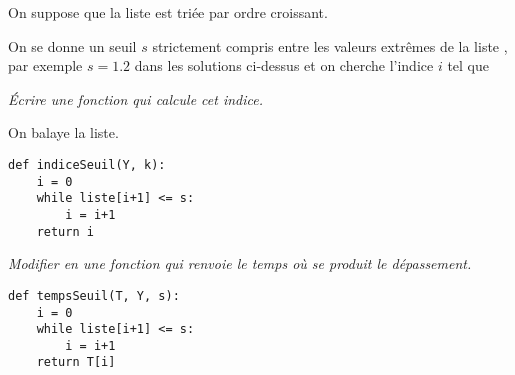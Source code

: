 On suppose que la liste  est triée par ordre croissant.

On se donne un seuil $s$ strictement compris entre les valeurs extrêmes de la liste , par exemple $s = 1.2$ dans les solutions ci-dessus et on cherche l'indice $i$ tel que 
\begin{Exercise}\it Écrire une fonction  qui calcule cet indice.
\end{Exercise}
\begin{Answer} On balaye la liste.
\begin{lstlisting}
def indiceSeuil(Y, k):
    i = 0
    while liste[i+1] <= s:
        i = i+1
    return i
\end{lstlisting}
\newpage
\end{Answer}
\begin{Exercise}\it Modifier en  une fonction  qui renvoie le temps  où se produit le dépassement.
\end{Exercise}
\begin{Answer} 
\begin{lstlisting}
def tempsSeuil(T, Y, s):
    i = 0
    while liste[i+1] <= s:
        i = i+1
    return T[i]
\end{lstlisting}
\end{Answer}
\medskip

